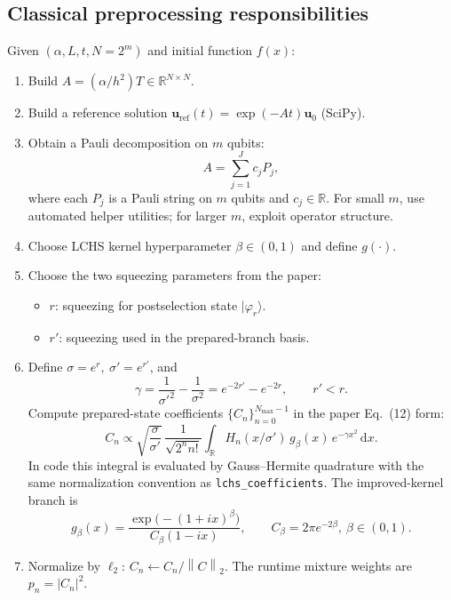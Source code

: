 \documentclass[11pt]{article}
\newcommand{\dd}{\mathrm{d}}
\newcommand{\RR}{\mathbb{R}}
\newcommand{\norm}[1]{\left\lVert #1 \right\rVert}
\begin{document}
\subsection{Classical preprocessing responsibilities}
Given $(\alpha,L,t,N=2^m)$ and initial function $f(x)$:
\begin{enumerate}[itemsep=3pt,topsep=3pt]
\item Build \(A=(\alpha/h^2)T\in\RR^{N\times N}\).
\item Build a reference solution $\mathbf u_{\mathrm{ref}}(t)=\exp(-At)\mathbf u_0$ (SciPy).
\item Obtain a Pauli decomposition on $m$ qubits:
\[
A = \sum_{j=1}^{J} c_j P_j,
\]
where each $P_j$ is a Pauli string on $m$ qubits and $c_j\in\RR$.
For small $m$, use automated helper utilities; for larger $m$, exploit operator structure.
\item Choose LCHS kernel hyperparameter $\beta\in(0,1)$ and define $g(\cdot)$.
\item Choose the two squeezing parameters from the paper:
\begin{itemize}[itemsep=2pt,topsep=2pt]
\item \(r\): squeezing for postselection state \(|\varphi_r\rangle\).
\item \(r'\): squeezing used in the prepared-branch basis.
\end{itemize}
\item Define \(\sigma=e^r,\ \sigma'=e^{r'}\), and
\[
\gamma=\frac{1}{\sigma'^2}-\frac{1}{\sigma^2}=e^{-2r'}-e^{-2r},\qquad r'<r.
\]
Compute prepared-state coefficients \(\{C_n\}_{n=0}^{N_{\max}-1}\) in the paper Eq.~(12) form:
\begin{equation}
C_n
\propto
\sqrt{\frac{\sigma}{\sigma'}}\,
\frac{1}{\sqrt{2^n n!}}
\int_{\RR} H_n(x/\sigma')\,g_\beta(x)\,e^{-\gamma x^2}\,\dd x.
\end{equation}
In code this integral is evaluated by Gauss--Hermite quadrature with the same normalization convention as
\texttt{lchs\_coefficients}. The improved-kernel branch is
\begin{equation}
g_\beta(x)=\frac{\exp\!\big(-(1+ix)^\beta\big)}{C_\beta(1-ix)},
\qquad
C_\beta=2\pi e^{-2\beta},\ \beta\in(0,1).
\end{equation}
\item Normalize by \(\ell_2\): \(C_n\leftarrow C_n/\norm{C}_2\). The runtime mixture weights are \(p_n=|C_n|^2\).
\end{enumerate}
\end{document}
